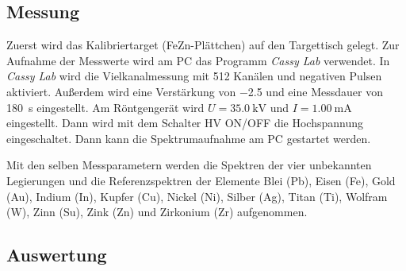 \subsection{Messung}\label{subsec:material_messung}
Zuerst wird das Kalibriertarget (FeZn-Plättchen) auf den Targettisch gelegt. Zur Aufnahme der Messwerte wird am PC das Programm \textit{Cassy Lab}
verwendet. In \textit{Cassy Lab} wird die Vielkanalmessung mit 512 Kanälen und negativen Pulsen aktiviert. Außerdem wird eine Verstärkung von
\num{-2,5} und eine Messdauer von \SI{180}{\second} eingestellt. Am Röntgengerät wird $U = \SI{35,0}{\kilo \volt}$ und $I = \SI{1,00}{\milli \ampere}$
eingestellt. Dann wird mit dem Schalter HV ON/OFF die Hochspannung eingeschaltet. Dann kann die Spektrumaufnahme am PC gestartet werden.\par
Mit den selben Messparametern werden die Spektren der vier unbekannten Legierungen und die Referenzspektren der Elemente Blei (Pb), Eisen (Fe),
Gold (Au), Indium (In), Kupfer (Cu), Nickel (Ni), Silber (Ag), Titan (Ti), Wolfram (W), Zinn (Su), Zink (Zn) und Zirkonium (Zr) aufgenommen.
\subsection{Auswertung}\label{subsec:material_auswertung}
